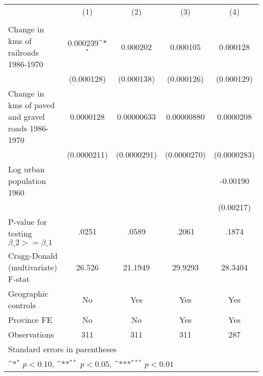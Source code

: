 {
\def\sym#1{\ifmmode^{#1}\else\(^{#1}\)\fi}
\begin{tabular}{l*{4}{c}}
\hline\hline
                &\multicolumn{1}{c}{(1)}&\multicolumn{1}{c}{(2)}&\multicolumn{1}{c}{(3)}&\multicolumn{1}{c}{(4)}\\
                &\multicolumn{1}{c}{}&\multicolumn{1}{c}{}&\multicolumn{1}{c}{}&\multicolumn{1}{c}{}\\
\hline
Change in kms of railroads 1986-1970& 0.000239\sym{*}  & 0.000202         & 0.000105         & 0.000128         \\
                &(0.000128)         &(0.000138)         &(0.000126)         &(0.000129)         \\
[1em]
Change in kms of paved and gravel roads 1986-1970&0.0000128         &0.00000633         &0.00000880         &0.0000208         \\
                &(0.0000211)         &(0.0000291)         &(0.0000270)         &(0.0000283)         \\
[1em]
Log urban population 1960&                  &                  &                  & -0.00190         \\
                &                  &                  &                  &(0.00217)         \\
\hline
P-value for testing $\beta\_{2} >= \beta\_{1}$&    .0251         &    .0589         &    .2061         &    .1874         \\
Cragg-Donald (multivariate) F-stat&   26.526         &  21.1949         &  29.9293         &  28.3404         \\
Geographic controls&       No         &      Yes         &      Yes         &      Yes         \\
Province FE     &       No         &       No         &      Yes         &      Yes         \\
Observations    &      311         &      311         &      311         &      287         \\
\hline\hline
\multicolumn{5}{l}{\footnotesize Standard errors in parentheses}\\
\multicolumn{5}{l}{\footnotesize \sym{*} \(p<0.10\), \sym{**} \(p<0.05\), \sym{***} \(p<0.01\)}\\
\end{tabular}
}
